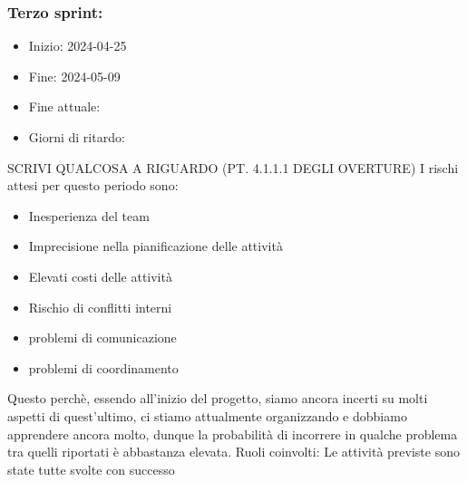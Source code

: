     \subsubsection{Terzo sprint:}
    \begin{itemize}
        \item Inizio: 2024-04-25
        \item Fine: 2024-05-09
        \item Fine attuale:
        \item Giorni di ritardo:
    \end{itemize}
    SCRIVI QUALCOSA A RIGUARDO (PT. 4.1.1.1 DEGLI OVERTURE)
    I rischi attesi per questo periodo sono:
    \begin{itemize}
        \item Inesperienza del team
        \item Imprecisione nella pianificazione delle attività
        \item Elevati costi delle attività
        \item Rischio di conflitti interni 
        \item problemi di comunicazione
        \item problemi di coordinamento
    \end{itemize}
    Questo perchè, essendo all’inizio del progetto, siamo ancora incerti su molti aspetti di quest’ultimo, ci stiamo attualmente organizzando e dobbiamo apprendere ancora molto, dunque la probabilità di incorrere in qualche problema tra quelli riportati è abbastanza elevata.
    Ruoli coinvolti: 
    Le attività previste sono state tutte svolte con successo

